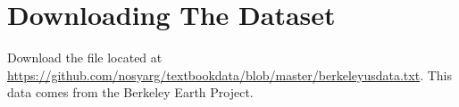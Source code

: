 \section{Downloading The Dataset}

Download the file located at \url{https://github.com/nosyarg/textbookdata/blob/master/berkeleyusdata.txt}.
This data comes from the Berkeley Earth Project.
